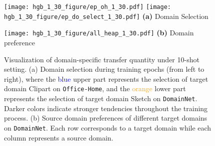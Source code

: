 \begin{figure}[htbp]
    \centering
    \begin{minipage}{0.45\linewidth}
        \centering
        \texttt{[image: hgb\_1\_30\_figure/ep\_oh\_1\_30.pdf]}
        \texttt{[image: hgb\_1\_30\_figure/ep\_do\_select\_1\_30.pdf]}
        \textbf{(a)} Domain Selection
    \end{minipage}
    \hfill
    \begin{minipage}{0.45\linewidth}
        \centering
        \texttt{[image: hgb\_1\_30\_figure/all\_heap\_1\_30.pdf]}
        \textbf{(b)} Domain preference
    \end{minipage}
    
    \caption{Visualization of domain-specific transfer quantity under 10-shot setting. (a) Domain selection during training epochs (from left to right), where the \textcolor{blue}{blue} upper part represents
    the selection of target domain Clipart on \texttt{Office-Home}, and the \textcolor{orange}{orange} lower part represents
    the selection of target domain Sketch on \texttt{DomainNet}. Darker colors indicate stronger tendencies throughout the training process. (b) Source domain preferences of different target domains on \texttt{DomainNet}. Each row corresponds to a target domain while each column represents a source domain.}
    \label{fig:domain_choosing}
\end{figure}




